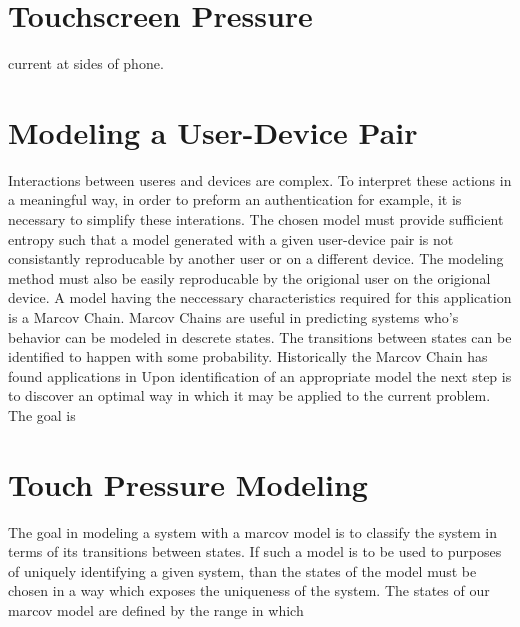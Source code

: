 \documentclass{acm_proc_article-sp}
\begin{document}
\section{Touchscreen Pressure}
\label{sec:touchscreen}
current at sides of phone.

\section{Modeling a User-Device Pair}
\label{sec:modeling}
Interactions between useres and devices are complex. To interpret these actions in a meaningful way, in order to preform an authentication for example, it is necessary to simplify these interations. The chosen model must provide sufficient entropy such that a model generated with a given user-device pair is not consistantly reproducable by another user or on a different device. The modeling method must also be easily reproducable by the origional user on the origional device. A model having the neccessary characteristics required for this application is a Marcov Chain.
%
Marcov Chains are useful in predicting systems who's behavior can be modeled in descrete states. The transitions between states can be identified to happen with some probability.
Historically the Marcov Chain has found applications in
%
Upon identification of an appropriate model the next step is to discover an optimal way in which it may be applied to the current problem. The goal is %
%


\section{Touch Pressure Modeling}
%
The goal in modeling a system with a marcov model is to classify the system in terms of its transitions between states. If such a model is to be used to purposes of uniquely identifying a given system, than the states of the model must be chosen in a way which exposes the uniqueness of the system.
The states of our marcov model are defined by the range in which
\end{document}
